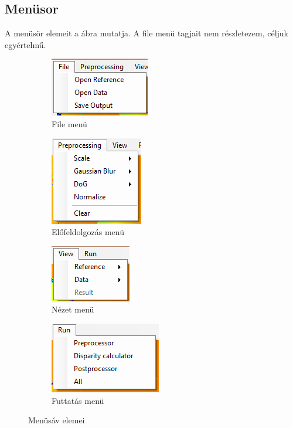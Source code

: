 \subsection{Menüsor}\label{sect:menuStrip}

A menüsör elemeit a  ábra mutatja.
A file menü tagjait nem részletezem, céljuk egyértelmű.

\begin{figure}[ht!]
	\begin{subfigure}{.5\textwidth}
	  \centering
	  \includegraphics{figures/gui_file.png}
	  \caption{File menü}
	  \label{fig:fileMenu}
	\end{subfigure}
	\begin{subfigure}{.5\textwidth}
	  \centering
	  \includegraphics{figures/gui_preproc.png}
	  \caption{Előfeldolgozás menü}
	  \label{fig:preprocMenu}
	\end{subfigure}
	\begin{subfigure}{.5\textwidth}
		\centering
		\includegraphics{figures/gui_view.png}
		\caption{Nézet menü}
		\label{fig:viewMenu}
	\end{subfigure}
	\begin{subfigure}{.5\textwidth}
		\centering
		\includegraphics{figures/gui_run.png}
		\caption{Futtatás menü}
		\label{fig:runMenu}
	\end{subfigure}
	\caption{Menüsáv elemei}
	\label{fig:menuStrip}
\end{figure}

